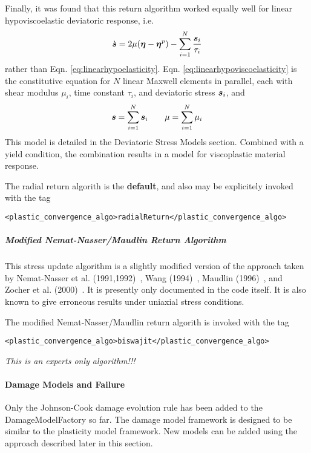 Finally, it was found that this return algorithm worked equally well
for linear hypoviscoelastic deviatoric response, i.e.
  \begin{equation}\label{eq:linearhypoviscoelasticity}
    \dot{\Bs} = 2\mu(\Beta - \Beta^p) - \sum_{i=1}^N {\Bs_i\over \tau_i}
  \end{equation}
rather than Eqn. \ref{eq:linearhypoelasticity}.
Eqn. \ref{eq:linearhypoviscoelasticity} is the constitutive equation
for $N$ linear Maxwell elements in parallel, each with shear modulus
$\mu_i$, time constant $\tau_i$, and deviatoric stress $\Bs_i$, and
  \begin{equation}
    \Bs = \sum_{i=1}^N \Bs_i \quad\quad \mu = \sum_{i=1}^N \mu_i
  \end{equation}
This model is detailed in the Deviatoric Stress Models section.
Combined with a yield condition, the combination results in a
model for viscoplastic material response.

The radial return algorith is the {\bf default}, and also may be
explicitely invoked with the tag
  \begin{Verbatim}[fontsize=\footnotesize]
    <plastic_convergence_algo>radialReturn</plastic_convergence_algo>
  \end{Verbatim}

\subparagraph{Modified Nemat-Nasser/Maudlin Return Algorithm}

This stress update algorithm is a slightly modified version of the
approach taken by Nemat-Nasser et
al. (1991,1992)~\cite{Nemat91,Nemat92}, Wang (1994)~\cite{Wang94},
Maudlin (1996)~\cite{Maudlin96}, and Zocher et
al. (2000)~\cite{Zocher00}.  It is presently only documented in the
code itself.  It is also known to give erroneous results under uniaxial
stress conditions.

The modified Nemat-Nasser/Maudlin return algorith is invoked with
the tag
  \begin{Verbatim}[fontsize=\footnotesize]
    <plastic_convergence_algo>biswajit</plastic_convergence_algo>
  \end{Verbatim}
{\it This is an experts only algorithm!!!}

\paragraph{Damage Models and Failure}
Only the Johnson-Cook damage evolution rule has been added to the
DamageModelFactory so far.  The damage model framework is designed
to be similar to the plasticity model framework.  New models can
be added using the approach described later in this section.

